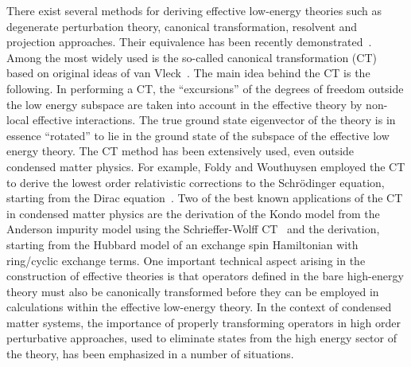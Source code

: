 \documentclass[aps,prb,twocolumn,superscriptaddress,
               amsmath]{revtex4}
\renewcommand{\=}{\,=\,}
\newcommand{\+}{\,+\,}
\renewcommand{\-}{\,-\,}
\begin{document}
There exist several methods for deriving effective low-energy
theories such as degenerate perturbation theory, 
canonical transformation, resolvent and projection approaches. 
Their equivalence has been recently demonstrated~\cite{Chernyshev}.
Among the most widely used 
is the so-called canonical transformation
(CT) based on original ideas of van Vleck~\cite{Vleck}.
The main idea behind the CT is the following.
In performing a CT, the ``excursions'' of the
degrees of freedom outside the low energy subspace are taken into account
in the effective theory by non-local effective interactions.
The true ground state eigenvector of the theory is in essence ``rotated''
to lie in the ground state of the subspace of the effective
low energy theory.
The CT method has been extensively used, even outside condensed matter physics.
For example, Foldy and Wouthuysen employed the CT to derive the lowest order
relativistic corrections to the Schr\"odinger equation, starting from the
Dirac equation~\cite{Foldy}.  Two of the best known applications of the CT in
condensed matter physics are the derivation of the Kondo model
from the Anderson impurity model using the Schrieffer-Wolff
CT~\cite{Schrieffer-Wolff} and the derivation, starting from the Hubbard model of an exchange spin Hamiltonian with ring/cyclic exchange terms\cite{Harris,MacDonald,Chernyshev}.  
One important technical aspect 
arising in the construction of effective theories
is that operators defined in the bare high-energy theory must also be canonically transformed
before they can be employed in calculations within the effective low-energy
theory. In the context of condensed matter systems,
the importance of properly transforming operators in high order perturbative
approaches, used to eliminate states from the high energy
sector of the theory, has been emphasized 
in a number of
situations.\cite{Harris,Sawatzky,Eskes:1994,Paramekanti,Hamer,Schmidt}
\end{document}
